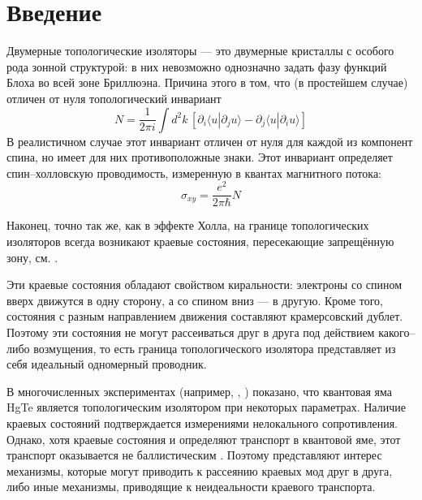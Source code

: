 	\newpage
	\section{Введение}
    Двумерные топологические изоляторы --- это двумерные кристаллы 
    с особого рода зонной структурой:
    в них невозможно однозначно задать фазу функций 
    Блоха во всей зоне Бриллюэна. Причина этого в том, что (в простейшем случае) 
    отличен от нуля
    топологический инвариант \cite{Kohmoto1985}
    \begin{equation}
        \label{TKNN}
        N = \frac{1}{2\pi i} 
            \int d^2 k\, \left[\partial_i \langle u | \partial_j u \rangle -
            \partial_j \langle u | \partial_i u \rangle \right]
    \end{equation}
    В реалистичном случае этот инвариант отличен от нуля для каждой из компонент спина,
    но имеет для них противоположные знаки.
    Этот инвариант определяет спин--холловскую проводимость, 
    измеренную в квантах 
    магнитного потока:
    \begin{equation}
        \sigma_{xy} = \frac{e^2}{2\pi \hbar} N
    \end{equation}
    
    Наконец, точно так же, как в эффекте Холла, 
    на границе топологических изоляторов всегда возникают краевые состояния,
    пересекающие запрещённую зону, см. \cite{Hasan2010}.

    Эти краевые состояния обладают свойством киральности: электроны со спином 
    вверх движутся в одну сторону, а со спином вниз --- в другую. Кроме того, состояния 
    с разным направлением движения составляют крамерсовский дублет. Поэтому
    эти состояния не могут рассеиваться друг в друга 
    под действием какого--либо возмущения, то есть граница топологического 
    изолятора представляет из себя идеальный одномерный проводник.

    В многочисленных экспериментах (например, \cite{Konig2007}, \cite{Gusev2011})
    показано, что квантовая яма HgTe является топологическим изолятором при 
    некоторых параметрах. Наличие краевых состояний подтверждается измерениями
    нелокального сопротивления. Однако, хотя краевые состояния и
    определяют транспорт в квантовой яме, этот транспорт оказывается не баллистическим 
    \cite{Gusev2011}.
    Поэтому представляют интерес механизмы, которые могут приводить
    к рассеянию краевых мод друг в друга, либо иные механизмы, приводящие к неидеальности
    краевого транспорта.

